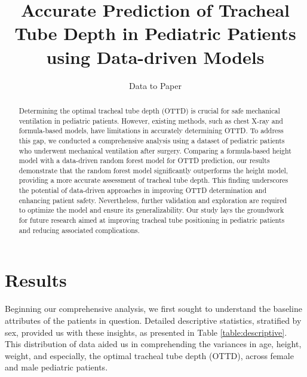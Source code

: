 \documentclass[11pt]{article}
\title{Accurate Prediction of Tracheal Tube Depth in Pediatric Patients using Data-driven Models}
\author{Data to Paper}
\begin{document}
\maketitle
\begin{abstract}
Determining the optimal tracheal tube depth (OTTD) is crucial for safe mechanical ventilation in pediatric patients. However, existing methods, such as chest X-ray and formula-based models, have limitations in accurately determining OTTD. To address this gap, we conducted a comprehensive analysis using a dataset of pediatric patients who underwent mechanical ventilation after surgery. Comparing a formula-based height model with a data-driven random forest model for OTTD prediction, our results demonstrate that the random forest model significantly outperforms the height model, providing a more accurate assessment of tracheal tube depth. This finding underscores the potential of data-driven approaches in improving OTTD determination and enhancing patient safety. Nevertheless, further validation and exploration are required to optimize the model and ensure its generalizability. Our study lays the groundwork for future research aimed at improving tracheal tube positioning in pediatric patients and reducing associated complications.
\end{abstract}
\section*{Results}

Beginning our comprehensive analysis, we first sought to understand the baseline attributes of the patients in question. Detailed descriptive statistics, stratified by sex, provided us with these insights, as presented in Table {}\ref{table:descriptive}. This distribution of data aided us in comprehending the variances in age, height, weight, and especially, the optimal tracheal tube depth (OTTD), across female and male pediatric patients. 
\end{document}
